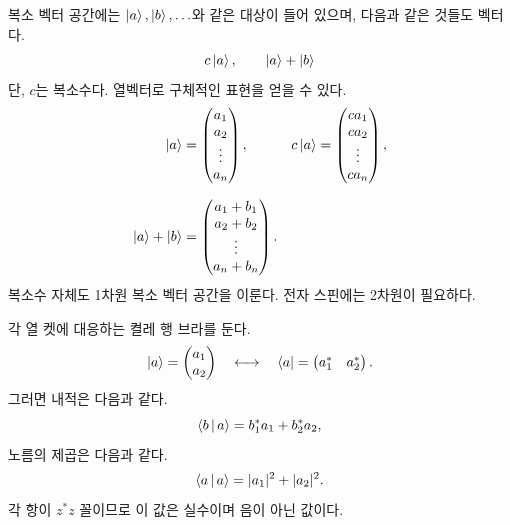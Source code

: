 복소 벡터 공간에는 \(\left\lvert a\right\rangle,\left\lvert b\right\rangle,\ldots\)와 같은 대상이 들어 있으며, 다음과 같은 것들도 벡터다.
\begin{equation}
  c\left\lvert a\right\rangle,
  \qquad
  \left\lvert a\right\rangle+\left\lvert b\right\rangle
\end{equation}
단, \(c\)는 복소수다. 열벡터로 구체적인 표현을 얻을 수 있다.
\begin{equation}
  \begin{aligned}
    \left\lvert a\right\rangle&=
    \begin{pmatrix}
      a_1\\a_2\\ \vdots\\a_n
    \end{pmatrix},
    &
    c\left\lvert a\right\rangle&=
    \begin{pmatrix}
      ca_1\\ca_2\\ \vdots\\ca_n
    \end{pmatrix},\\[0.7em]
    \left\lvert a\right\rangle+\left\lvert b\right\rangle&=
    \begin{pmatrix}
      a_1+b_1\\a_2+b_2\\ \vdots\\a_n+b_n
    \end{pmatrix}.
  \end{aligned}
  \label{eq:l02-vector-operations}
\end{equation}
복소수 자체도 1차원 복소 벡터 공간을 이룬다. 전자 스핀에는 2차원이 필요하다.

각 열 켓에 대응하는 켤레 행 브라를 둔다.
\begin{equation}
  \left\lvert a\right\rangle=
  \begin{pmatrix}a_1\\a_2\end{pmatrix}
  \quad\longleftrightarrow\quad
  \left\langle a\right\rvert=
  \begin{pmatrix}a_1^*&a_2^*\end{pmatrix}.
  \label{eq:l02-bra-ket-components}
\end{equation}
그러면 내적은 다음과 같다.
\begin{equation}
  \left\langle b\,\middle|\,a\right\rangle=b_1^*a_1+b_2^*a_2,
  \label{eq:l02-inner-product}
\end{equation}
노름의 제곱은 다음과 같다.
\begin{equation}
  \left\langle a\,\middle|\,a\right\rangle=|a_1|^2+|a_2|^2.
  \label{eq:l02-norm}
\end{equation}
각 항이 \(z^*z\) 꼴이므로 이 값은 실수이며 음이 아닌 값이다.

